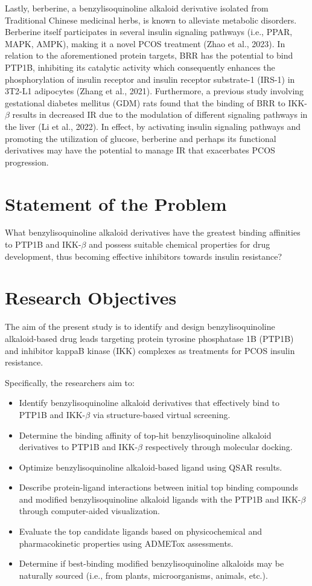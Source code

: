 Lastly, berberine, a benzylisoquinoline alkaloid derivative isolated from Traditional Chinese medicinal herbs, is known to alleviate metabolic disorders. Berberine itself participates in several insulin signaling pathways (i.e., PPAR, MAPK, AMPK), making it a novel PCOS treatment (Zhao et al., 2023). In relation to the aforementioned protein targets, BRR has the potential to bind PTP1B, inhibiting its catalytic activity which consequently enhances the phosphorylation of insulin receptor and insulin receptor substrate-1 (IRS-1) in 3T2-L1 adipocytes (Zhang et al., 2021). Furthermore, a previous study involving gestational diabetes mellitus (GDM) rats found that the binding of BRR to IKK-$\beta$ results in decreased IR due to the modulation of different signaling pathways in the liver (Li et al., 2022). In effect, by activating insulin signaling pathways and promoting the utilization of glucose, berberine and perhaps its functional derivatives may have the potential to manage IR that exacerbates PCOS progression.

\section{Statement of the Problem}
What benzylisoquinoline alkaloid derivatives have the greatest binding affinities to PTP1B and IKK-$\beta$ and possess suitable chemical properties for drug development, thus becoming effective inhibitors towards insulin resistance?  

\section{Research Objectives}
The aim of the present study is to identify and design benzylisoquinoline alkaloid-based drug leads targeting protein tyrosine phosphatase 1B (PTP1B) and inhibitor kappaB kinase (IKK) complexes as treatments for PCOS insulin resistance. 

Specifically, the researchers aim to: 
\begin{itemize}
     \item Identify benzylisoquinoline alkaloid derivatives that effectively bind to PTP1B and IKK-$\beta$ via structure-based virtual screening.
     \item Determine the binding affinity of top-hit benzylisoquinoline alkaloid derivatives to PTP1B and IKK-$\beta$ respectively through molecular docking. 
    \item Optimize benzylisoquinoline alkaloid-based ligand using QSAR results.
    \item Describe protein-ligand interactions between initial top binding compounds and modified benzylisoquinoline alkaloid ligands with the PTP1B and IKK-$\beta$ through computer-aided visualization. 
    \item Evaluate the top candidate ligands based on physicochemical and pharmacokinetic properties using ADMETox assessments.
    \item Determine if best-binding modified benzylisoquinoline alkaloids may be naturally sourced (i.e., from plants, microorganisms, animals, etc.).
\end{itemize}

